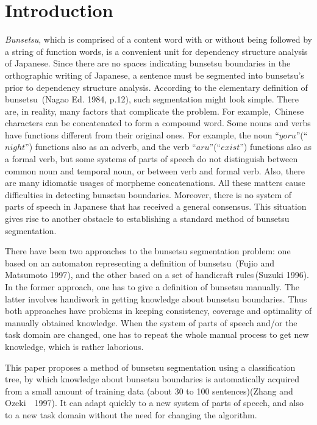 \maketitle

\section{Introduction}
{\em Bunsetsu},  which is comprised of a content word
with or without being followed by a string of function words, is a
convenient
unit for dependency structure analysis of Japanese.
Since there are no spaces indicating bunsetsu boundaries in the
orthographic writing of Japanese, 
a sentence must be segmented into bunsetsu's prior to
dependency structure analysis.
According to the elementary definition of bunsetsu \,(Nagao Ed. 1984, p.12), 
such  segmentation might look simple.
There are, in reality, many factors that complicate the problem.
For example,\ Chinese characters can be concatenated to form a compound
word.
Some nouns and verbs have functions different from their original
ones. For example, the noun ``$yoru$''(``$night$'')    functions also as
 an adverb,  and the verb ``$aru$''(``$exist$'')  functions also as a 
 formal verb, but some systems of parts of speech do not
distinguish between common noun and temporal noun, or  between verb
and formal verb.
Also, there are many idiomatic usages of morpheme concatenations.
All these matters cause difficulties in detecting bunsetsu
boundaries.
Moreover, there is no system of parts of speech 
in Japanese
that has received a general consensus.
This situation gives rise to another obstacle to
establishing a standard method of bunsetsu segmentation.

There have been two approaches to the
bunsetsu segmentation problem: one based on an
automaton representing a definition of bunsetsu \,(Fujio and Matsumoto 1997), 
and the other based on a set of
handicraft rules\,(Suzuki 1996). In the former approach, one has to give a
definition of bunsetsu manually. The latter
involves handiwork in getting knowledge about
bunsetsu boundaries. Thus both approaches
have problems in keeping consistency, coverage and optimality
of manually obtained knowledge.
When  the system of parts of speech and/or the task domain are
changed, one has to repeat the whole manual process
to get new knowledge, which is rather laborious.

This paper proposes a method of bunsetsu segmentation using a
classification tree, by which knowledge about bunsetsu boundaries
is automatically acquired from a small amount of training data (about 30 
to 100 sentences)(Zhang and Ozeki\ \   1997). 
 It can adapt quickly to a new system of parts of speech, and
also to a new task domain without the need for changing the algorithm.
 
